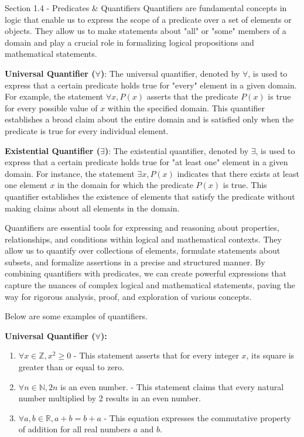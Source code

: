 \begin{notes}{Section 1.4 - Predicates \& Quantifiers}
    Quantifiers are fundamental concepts in logic that enable us to express the scope of a predicate over a set of elements or objects. They allow us to make statements about "all" or "some" members of a domain and play a crucial role in formalizing 
    logical propositions and mathematical statements.

    \textbf{Universal Quantifier (\(\forall\))}: The universal quantifier, denoted by \(\forall\), is used to express that a certain predicate holds true for "every" element in a given domain. For example, the statement \(\forall x, P(x)\) asserts that 
    the predicate \(P(x)\) is true for every possible value of \(x\) within the specified domain. This quantifier establishes a broad claim about the entire domain and is satisfied only when the predicate is true for every individual element.

    \textbf{Existential Quantifier (\(\exists\))}: The existential quantifier, denoted by \(\exists\), is used to express that a certain predicate holds true for "at least one" element in a given domain. For instance, the statement \(\exists x, P(x)\) 
    indicates that there exists at least one element \(x\) in the domain for which the predicate \(P(x)\) is true. This quantifier establishes the existence of elements that satisfy the predicate without making claims about all elements in the domain.

    Quantifiers are essential tools for expressing and reasoning about properties, relationships, and conditions within logical and mathematical contexts. They allow us to quantify over collections of elements, formulate statements about subsets, 
    and formalize assertions in a precise and structured manner. By combining quantifiers with predicates, we can create powerful expressions that capture the nuances of complex logical and mathematical statements, paving the way for rigorous analysis, 
    proof, and exploration of various concepts.

    \begin{highlight}
        Below are some examples of quantifiers.

        \textbf{Universal Quantifier (\(\forall\)):}
        \begin{enumerate}
            \item \(\forall x \in \mathbb{Z}, x^2 \geq 0\) - This statement asserts that for every integer \(x\), its square is greater than or equal to zero.
            \item \(\forall n \in \mathbb{N}, 2n\) is an even number. - This statement claims that every natural number multiplied by 2 results in an even number.
            \item \(\forall a, b \in \mathbb{R}, a + b = b + a\) - This equation expresses the commutative property of addition for all real numbers \(a\) and \(b\).
        \end{enumerate}
        

\end{highlight}
\end{notes}
